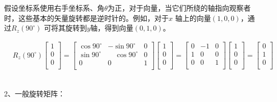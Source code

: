假设坐标系使用右手坐标系、角$\theta$为正，对于向量，当它们所绕的轴指向观察者时，这些基本的矢量旋转都是逆时针的。例如，对于$x$ 轴上的向量$(1,0,0)$，通过$R_z(90^{\circ })$ 可将其旋转到$y$轴，得到向量$(0,1,0)$。

\begin{align}
& {\displaystyle R_{z}(90^{\circ }){\begin{bmatrix}1\\0\\0\\\end{bmatrix}}={\begin{bmatrix}\cos 90^{\circ }&-\sin 90^{\circ }&0\\\sin 90^{\circ }&\quad \cos 90^{\circ }&0\\0&0&1\\\end{bmatrix}}{\begin{bmatrix}1\\0\\0\\\end{bmatrix}}={\begin{bmatrix}0&-1&0\\1&0&0\\0&0&1\\\end{bmatrix}}{\begin{bmatrix}1\\0\\0\\\end{bmatrix}}={\begin{bmatrix}0\\1\\0\\\end{bmatrix}}}
\end{align}

\quad \\

2、一般旋转矩阵：

